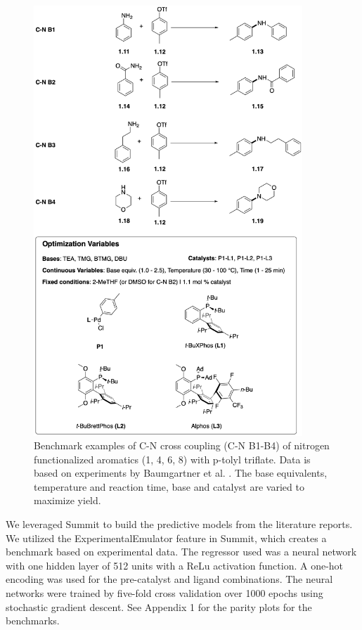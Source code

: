 \begin{figure}
    \centering
    \includegraphics[width=0.9\textwidth]{gfx/Chapter03/c_n_benchmarks_thesis.png}
    \caption{Benchmark examples of C-N cross coupling (C-N B1-B4) of nitrogen functionalized aromatics (1, 4, 6, 8) with p-tolyl triflate. Data is based on experiments by Baumgartner et al. 
 \cite{Baumgartner2019}. The base equivalents, temperature and reaction time, base and catalyst are varied to maximize yield.}
    \label{fig:benchmarks_cn}
\end{figure}



We leveraged Summit to build the predictive models from the literature reports. We utilized the ExperimentalEmulator feature in Summit, which creates a benchmark based on experimental data. The regressor used was a neural network with one hidden layer of 512 units with a ReLu activation function. A one-hot encoding was used for the pre-catalyst and ligand combinations. The neural networks were trained by five-fold cross validation over 1000 epochs using stochastic gradient descent. See Appendix 1 for the parity plots for the benchmarks. 

